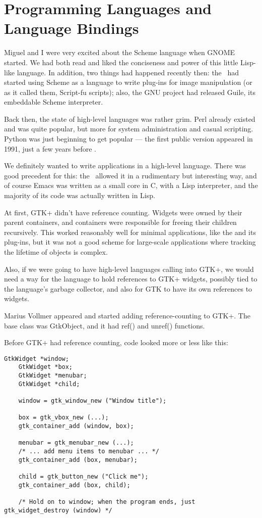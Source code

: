 \chapter{Programming Languages and Language Bindings}

Miguel and I were very excited about the Scheme language when GNOME
started.  We had both read \cite{sicp} and liked the conciseness and
power of this little Lisp-like language.  In addition, two things had
happened recently then:  the \GIMP\ had started using Scheme as a
language to write plug-ins for image manipulation (or as it called
them, Script-fu scripts); also, the GNU project had released Guile,
its embeddable Scheme interpreter.

Back then, the state of high-level languages was rather grim.  Perl
already existed and was quite popular, but more for system
administration and casual scripting.  Python was just beginning to get
popular --- the first public version appeared in 1991, just a few
years before \GNOME.

We definitely wanted to write applications in a high-level language.
There was good precedent for this:  the \GIMP\ allowed it in a
rudimentary but interesting way, and of course Emacs was written as a
small core in C, with a Lisp interpreter, and the majority of its code
was actually written in Lisp.

At first, GTK+ didn't have reference counting.  Widgets were owned by
their parent containers, and containers were responsible for freeing
their children recursively.  This worked reasonably well for minimal
applications, like the \GIMP and its plug-ins, but it was not a good
scheme for large-scale applications where tracking the lifetime of
objects is complex.

Also, if we were going to have high-level languages calling into GTK+,
we would need a way for the language to hold references to GTK+
widgets, possibly tied to the language's garbage collector, and also
for GTK to have its own references to widgets.

Marius Vollmer appeared and started adding reference-counting to
GTK+.  The base class was GtkObject, and it had ref() and unref()
functions.

Before GTK+ had reference counting, code looked more or less like
this:

\begin{lstlisting}[basicstyle=\footnotesize]
    GtkWidget *window;
    GtkWidget *box;
    GtkWidget *menubar;
    GtkWidget *child;

    window = gtk_window_new ("Window title");

    box = gtk_vbox_new (...);
    gtk_container_add (window, box);

    menubar = gtk_menubar_new (...);
    /* ... add menu items to menubar ... */
    gtk_container_add (box, menubar);

    child = gtk_button_new ("Click me");
    gtk_container_add (box, child);

    /* Hold on to window; when the program ends, just gtk_widget_destroy (window) */
\end{lstlisting}

